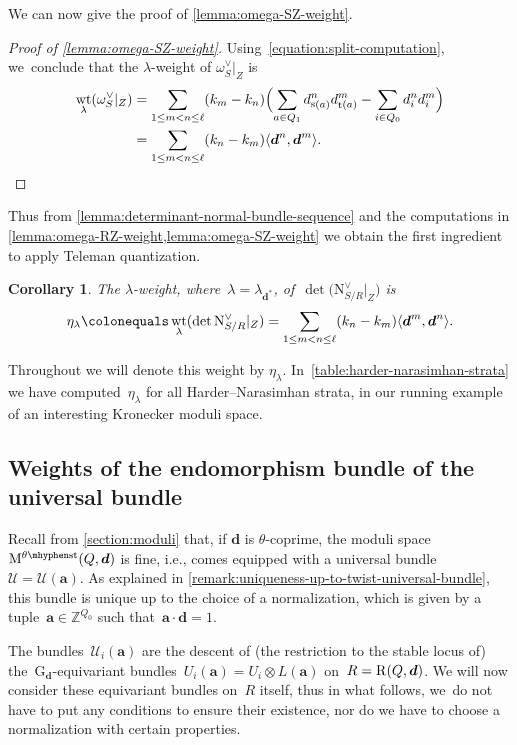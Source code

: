 \documentclass[11pt]{article}
\theoremstyle{plain}
\newtheorem{corollary}[theorem]{Corollary}
\theoremstyle{definition}
\DeclareMathOperator\source{s}
\DeclareMathOperator\target{t}
\DeclareMathOperator\weight{wt}
\newcommand\group[1][\tuple{d}]{\mathrm{G}_{#1}}
\newcommand\normal{\ensuremath{\mathrm{N}}}
\newcommand\stable{\ensuremath{\mhyphen\mathrm{st}}}
\newcommand\tuple[1]{\ensuremath{{\boldsymbol{#1}}}}
\begin{document}
We can now give the proof of \cref{lemma:omega-SZ-weight}.
\begin{proof}[Proof of \cref{lemma:omega-SZ-weight}]
Using~\eqref{equation:split-computation}, we~conclude that the $\lambda$-weight of $\omega_S^\vee|_Z$ is
\begin{align*}
\weight_{\lambda}(\omega_S^\vee|_Z)
&= \sum_{1 \leq m < n \leq \ell} (k_m - k_n) \Bigl(\sum_{a \in Q_1} d_{\source(a)}^n d_{\target(a)}^m - \sum_{i \in Q_0} d_i^n d_i^m\Bigr) \\
&= \sum_{1\leq m < n \leq \ell} (k_n - k_m) \langle \tuple{d}^n,\tuple{d}^m \rangle.\qedhere
\end{align*}
\end{proof}
Thus from \cref{lemma:determinant-normal-bundle-sequence}
and the computations in \cref{lemma:omega-RZ-weight,lemma:omega-SZ-weight}
we obtain the first ingredient to apply Teleman quantization.
\begin{corollary}
\label{corollary:determinant-weight}
The $\lambda$-weight,
where~$\lambda=\lambda_{\tuple{d}^*}$,
of~$\det\bigl(\normal_{S/R}^\vee|_Z\bigr)$ is
\begin{equation}
\eta_\lambda\colonequals\weight_{\lambda}(\det\normal_{S/R}^\vee|_Z) = \sum_{1 \leq m < n \leq \ell}(k_n - k_m)\langle \tuple{d}^m,\tuple{d}^n \rangle.
\end{equation}
\end{corollary}
Throughout we will denote this weight by $\eta_\lambda$. In~\cref{table:harder-narasimhan-strata} we have computed~$\eta_\lambda$
for all Harder--Narasimhan strata,
in our running example of an interesting Kronecker moduli space.

\subsection{Weights of the endomorphism bundle of the universal bundle}
\label{subsection:weights-endomorphism-bundle}
Recall from \cref{section:moduli} that,
if $\tuple{d}$ is $\theta$-coprime,
the moduli space~$\modulispace[\theta\stable]{Q,\tuple{d}}$
is fine, i.e.,
comes equipped with a universal bundle~$\mathcal{U}=\mathcal{U}(\tuple{a})$.
As explained in \cref{remark:uniqueness-up-to-twist-universal-bundle},
this bundle is unique up to the choice of a normalization,
which is given by a tuple~$\tuple{a}\in\mathbb{Z}^{Q_0}$ such that~$\tuple{a}\cdot\tuple{d}=1$.

The bundles~$\mathcal{U}_i(\tuple{a})$ are the descent of
(the restriction to the stable locus of)
the~$\group$\nobreakdash-equivariant bundles~$U_i(\tuple{a})=U_i\otimes L(\tuple{a})$
on~$R=\repspace{Q,\tuple{d}}$.
We will now consider these equivariant bundles on~$R$ itself,
thus in what follows, we~do not have to put any conditions to ensure their existence,
nor do we have to choose a normalization with certain properties.
\end{document}
